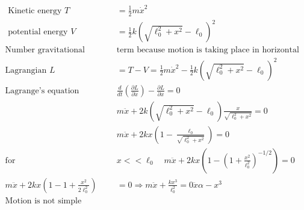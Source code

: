 \begin{enumerate}
\begin{answer}
\begin{align*}
\text{	Kinetic energy }T&=\frac{1}{2} m \dot{x}^{2}\\
\text{	potential energy }V&=\frac{1}{2} k\left(\sqrt{\ell_{0}^{2}+x^{2}}-\ell_{0}\right)^{2}\\
\text{Number gravitational potential energy }&\text{term because motion is taking place in horizontal plane.}\\
\text{Lagrangian }L&=T-V=\frac{1}{2} m \dot{x}^{2}-\frac{1}{2} k\left(\sqrt{\ell_{0}^{2}+x^{2}}-\ell_{0}\right)^{2}\\
\text{Lagrange's equation}
&\frac{d}{d t}\left(\frac{\partial L}{\partial \dot{x}}\right)-\frac{\partial L}{\partial x}=0 \\
&m \ddot{x}+2 k\left(\sqrt{\ell_{0}^{2}+x^{2}}-\ell_{0}\right) \frac{x}{\sqrt{\ell_{0}^{2}+x^{2}}}=0 \\
&m \ddot{x}+2 k x\left(1-\frac{\ell_{0}}{\sqrt{\ell_{0}^{2}+x^{2}}}\right)=0\\
\text{for }&x<<\ell_{0} \quad m \ddot{x}+2 k x\left(1-\left(1+\frac{x^{2}}{\ell_{0}^{2}}\right)^{-1 / 2}\right)=0\\
m \ddot{x}+2 k x\left(1-1+\frac{x^{2}}{2 \ell_{0}^{2}}\right)&=0 \Rightarrow m \ddot{x}+\frac{k x^{3}}{\ell_{0}^{2}}=0 \ddot{x} \alpha-x^{3}\\
\text{Motion is not simple harmonic.}
	\end{align*}
\end{answer}
\end{enumerate}
